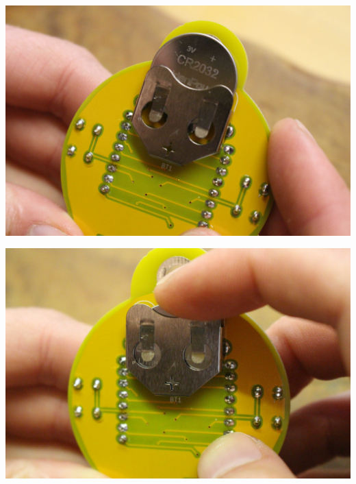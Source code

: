 \documentclass{article}
\begin{document}
\begin{minipage}[b]{0.5\textwidth}
	\includegraphics[width=\textwidth]{Bilder/IMG_5627.JPG}
	\label{fig:}
\end{minipage}
\begin{minipage}[b]{0.5\textwidth}
	\includegraphics[width=\textwidth]{Bilder/IMG_5628.JPG}
	\label{fig:}
\end{minipage}
\end{document}
